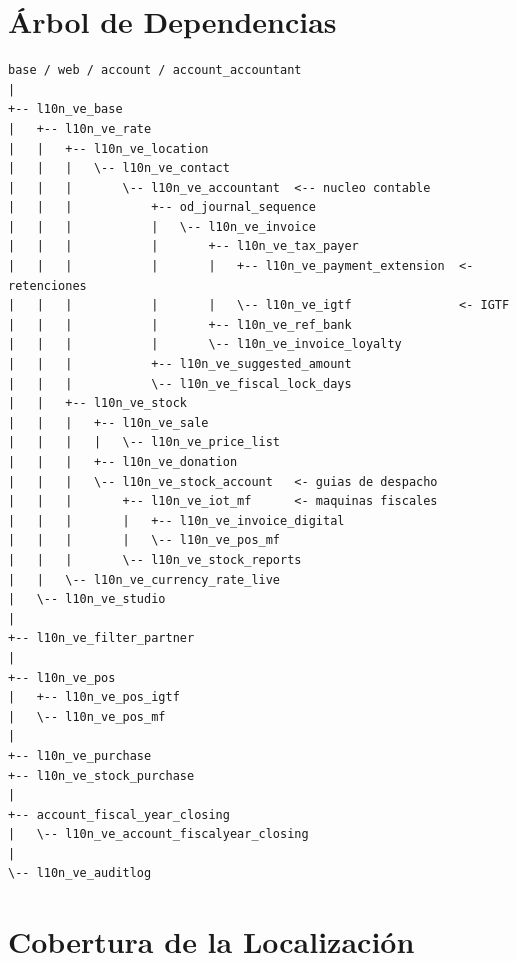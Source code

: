 \documentclass[11pt,a4paper]{article}
\begin{document}
\begin{Form}
\clearpage

\section{Árbol de Dependencias}

\begin{tcolorbox}[arbolbox]
\begin{small}
\begin{ttfamily}
\begin{verbatim}
base / web / account / account_accountant
|
+-- l10n_ve_base
|   +-- l10n_ve_rate
|   |   +-- l10n_ve_location
|   |   |   \-- l10n_ve_contact
|   |   |       \-- l10n_ve_accountant  <-- nucleo contable
|   |   |           +-- od_journal_sequence
|   |   |           |   \-- l10n_ve_invoice
|   |   |           |       +-- l10n_ve_tax_payer
|   |   |           |       |   +-- l10n_ve_payment_extension  <- retenciones
|   |   |           |       |   \-- l10n_ve_igtf               <- IGTF
|   |   |           |       +-- l10n_ve_ref_bank
|   |   |           |       \-- l10n_ve_invoice_loyalty
|   |   |           +-- l10n_ve_suggested_amount
|   |   |           \-- l10n_ve_fiscal_lock_days
|   |   +-- l10n_ve_stock
|   |   |   +-- l10n_ve_sale
|   |   |   |   \-- l10n_ve_price_list
|   |   |   +-- l10n_ve_donation
|   |   |   \-- l10n_ve_stock_account   <- guias de despacho
|   |   |       +-- l10n_ve_iot_mf      <- maquinas fiscales
|   |   |       |   +-- l10n_ve_invoice_digital
|   |   |       |   \-- l10n_ve_pos_mf
|   |   |       \-- l10n_ve_stock_reports
|   |   \-- l10n_ve_currency_rate_live
|   \-- l10n_ve_studio
|
+-- l10n_ve_filter_partner
|
+-- l10n_ve_pos
|   +-- l10n_ve_pos_igtf
|   \-- l10n_ve_pos_mf
|
+-- l10n_ve_purchase
+-- l10n_ve_stock_purchase
|
+-- account_fiscal_year_closing
|   \-- l10n_ve_account_fiscalyear_closing
|
\-- l10n_ve_auditlog
\end{verbatim}
\end{ttfamily}
\end{small}
\end{tcolorbox}

\clearpage

\section{Cobertura de la Localización}


\end{Form}
\end{document}
